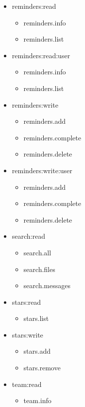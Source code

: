 \begin{multicols}{2}
\begin{itemize}
	\item reminders:read
	\begin{itemize}
		\item reminders.info
		\item reminders.list
	\end{itemize}
	
	\item reminders:read:user
	\begin{itemize}
		\item reminders.info
		\item reminders.list
	\end{itemize}
	
	\item reminders:write
	\begin{itemize}
		\item reminders.add
		\item reminders.complete
		\item reminders.delete
	\end{itemize}
	
	\item reminders:write:user
	\begin{itemize}
		\item reminders.add
		\item reminders.complete
		\item reminders.delete
	\end{itemize}
	
	\item search:read
	\begin{itemize}
		\item search.all
		\item search.files
		\item search.messages
	\end{itemize}
	
	\item stars:read
	\begin{itemize}
		\item stars.list
	\end{itemize}
	
	\item stars:write
	\begin{itemize}
		\item stars.add
		\item stars.remove
	\end{itemize}
	
	\item team:read
	\begin{itemize}
		\item team.info
	\end{itemize}
	

\end{itemize}
\end{multicols}
